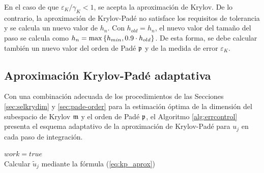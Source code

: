 En el caso de que $\varepsilon_{K}/\gamma_K< 1$, se acepta la aproximación de Krylov. De lo contrario, la aproximación de Krylov-Padé no satisface los requisitos de tolerancia y se calcula un nuevo valor de $h_n$. Con $h_{old}=h_n$, el nuevo valor del tamaño del paso se calcula como $h_n=\max\left\{ h_{min},0\mathord{.}9\cdot h_{old} \right\}$. De esta forma, se debe calcular también un nuevo valor del orden de Padé $\mathfrak{p}$ y de la medida de error $\varepsilon_{K}$.

\subsection{Aproximación Krylov-Padé adaptativa}\label{secc:krylov-Pade}
Con una combinación adecuada de los procedimientos de las Secciones \ref{sec:selkrydim} y \ref{sec:pade-order} para la estimación óptima de la dimensión del subespacio de Krylov $\mathfrak{m}$ y el orden de Padé $\mathfrak{p}$, el Algoritmo \ref{alg:errcontrol} presenta el esquema adaptativo de la aproximación de Krylov-Padé para $u_j$ en cada paso de integración.

{\SetAlgoNoLine
\begin{algorithm}[!htb]
	\caption{Algoritmo para el cálculo de las funciones $u_j$ en (\ref{LLDPK scheme}) mediante la aproximación adaptativa Krylov-Padé}
	\label{alg:errcontrol}
	$work=true$\\
	Calcular $\widetilde{u}_j$ mediante la fórmula (\ref{eq:kp_aprox})\\
\end{algorithm}}

